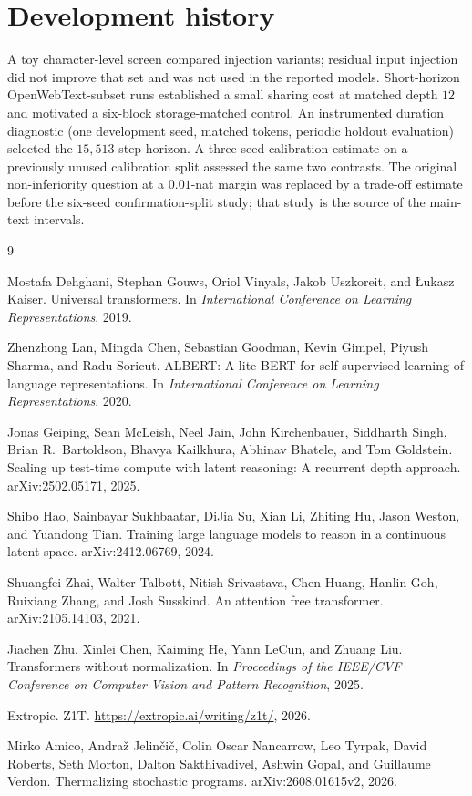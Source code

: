 \documentclass{article}
\begin{document}
\section{Development history}
\label{app:history}

A toy character-level screen compared injection variants; residual input injection did not improve that set and was not used in the reported models. Short-horizon OpenWebText-subset runs established a small sharing cost at matched depth $12$ and motivated a six-block storage-matched control. An instrumented duration diagnostic (one development seed, matched tokens, periodic holdout evaluation) selected the $15{,}513$-step horizon. A three-seed calibration estimate on a previously unused calibration split assessed the same two contrasts. The original non-inferiority question at a $0.01$-nat margin was replaced by a trade-off estimate before the six-seed confirmation-split study; that study is the source of the main-text intervals.

\begin{thebibliography}{9}

Mostafa Dehghani, Stephan Gouws, Oriol Vinyals, Jakob Uszkoreit, and {\L}ukasz Kaiser.
\newblock Universal transformers.
\newblock In \emph{International Conference on Learning Representations}, 2019.

Zhenzhong Lan, Mingda Chen, Sebastian Goodman, Kevin Gimpel, Piyush Sharma, and Radu Soricut.
\newblock ALBERT: A lite BERT for self-supervised learning of language representations.
\newblock In \emph{International Conference on Learning Representations}, 2020.

Jonas Geiping, Sean McLeish, Neel Jain, John Kirchenbauer, Siddharth Singh, Brian R.\ Bartoldson, Bhavya Kailkhura, Abhinav Bhatele, and Tom Goldstein.
\newblock Scaling up test-time compute with latent reasoning: A recurrent depth approach.
\newblock arXiv:2502.05171, 2025.

Shibo Hao, Sainbayar Sukhbaatar, DiJia Su, Xian Li, Zhiting Hu, Jason Weston, and Yuandong Tian.
\newblock Training large language models to reason in a continuous latent space.
\newblock arXiv:2412.06769, 2024.

Shuangfei Zhai, Walter Talbott, Nitish Srivastava, Chen Huang, Hanlin Goh, Ruixiang Zhang, and Josh Susskind.
\newblock An attention free transformer.
\newblock arXiv:2105.14103, 2021.

Jiachen Zhu, Xinlei Chen, Kaiming He, Yann LeCun, and Zhuang Liu.
\newblock Transformers without normalization.
\newblock In \emph{Proceedings of the IEEE/CVF Conference on Computer Vision and Pattern Recognition}, 2025.

Extropic.
\newblock Z1T.
\newblock \url{https://extropic.ai/writing/z1t/}, 2026.

Mirko Amico, Andra\v{z} Jelin\v{c}i\v{c}, Colin Oscar Nancarrow, Leo Tyrpak, David Roberts, Seth Morton, Dalton Sakthivadivel, Ashwin Gopal, and Guillaume Verdon.
\newblock Thermalizing stochastic programs.
\newblock arXiv:2608.01615v2, 2026.

\end{thebibliography}
\end{document}
